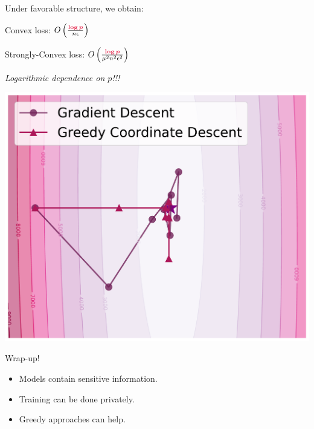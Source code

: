 \documentclass{beamer}
\begin{document}
\begin{frame}
  \huge
  \vspace{1em}

  \begin{center}

    Under favorable structure, we obtain:

    \vspace{1.5em}

    Convex loss: $O\left( \frac{\emphcol{\log{p}}}{n\epsilon} \right)$

    Strongly-Convex loss: $O\left( \frac{\emphcol{\log{p}}}{\mu^2 n^2\epsilon^2} \right)$

  \vspace{2em} \pause

  \huge
  \emph{Logarithmic dependence on $p$!!! \Smiley{}}

  \vspace{0.5em}

  \end{center}
\end{frame}

\hspace{-3.3em}
\begin{frame}
  \vspace{-0.3em}
  \includegraphics[width=1.17\textwidth]{example_3.pdf}
\end{frame}

\begin{frame}

  \begin{center}
    {\huge Wrap-up!}

    \vspace{1em}

    \begin{itemize}
    \item Models contain sensitive information.
    \item Training can be done privately.
    \item Greedy approaches can help.
    \end{itemize}
  \end{center}
\end{frame}
\end{document}
